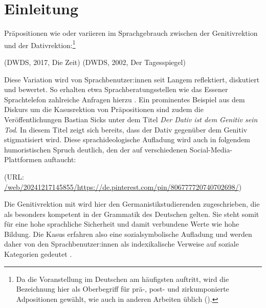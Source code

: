 \chapter{Einleitung}
Präpositionen wie \wegen{} oder \dank{} variieren im Sprachgebrauch zwischen der Genitivrektion und der Dativrektion:\footnote{Da die Voranstellung im Deutschen am häufigsten auftritt, wird die Bezeichnung  hier als Oberbegriff für prä-, post- und zirkumponierte Adpositionen gewählt, wie auch in anderen Arbeiten üblich (\cites[vgl. etwa][629--630]{Griehaber2009}[39]{Romare.2004}[356]{Helbig.2017}).} 
\begin{exe}
\ex {} (DWDS, 2017, Die Zeit)
\ex {} (DWDS, 2002, Der Tagesspiegel)
\end{exe}
Diese Variation wird von Sprachbenutzer:innen seit Langem reflektiert, diskutiert und bewertet. 
So erhalten etwa Sprachberatungsstellen wie das Essener Sprachtelefon zahlreiche Anfragen hierzu \citep[s.][121]{Bunting1996}. 
Ein prominentes Beispiel aus dem Diskurs um die Kasusrektion von Präpositionen sind zudem die Veröffentlichungen Bastian Sicks unter dem Titel \textit{Der Dativ ist dem Genitiv sein Tod}. 
In diesem Titel zeigt sich bereits, dass der Dativ gegenüber dem Genitiv stigmatisiert wird. 
Diese sprachideologische Aufladung wird auch in folgendem humoristischen Spruch deutlich, den der auf verschiedenen Social-Media-Plattformen auftaucht:
\begin{exe}
\ex {} (URL: \url{/web/20241217145855/https://de.pinterest.com/pin/806777720740702698/})
\end{exe}
Die Genitivrektion mit \wegen{} wird hier den Germanistikstudierenden zugeschrieben, die als besonders kompetent in der Grammatik des Deutschen gelten. 
Sie steht somit für eine hohe sprachliche Sicherheit und damit verbundene Werte wie hohe Bildung. 
Die Kasus erfahren also eine sozialsymbolische Aufladung und werden daher von den Sprachbenutzer:innen als indexikalische Verweise auf soziale Kategorien gedeutet \citep[s.][]{Silverstein2003}.

